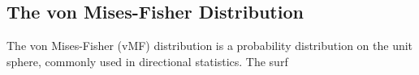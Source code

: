 \subsection{The von Mises-Fisher Distribution}

The von Mises-Fisher (vMF) distribution is a probability distribution on the unit sphere, commonly used in directional statistics. The surf